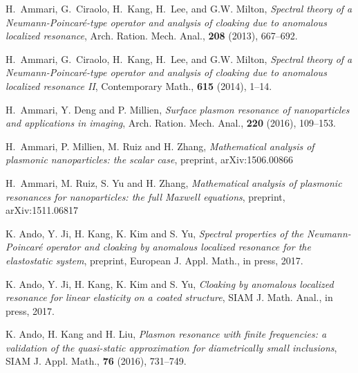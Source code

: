\documentclass[11pt,reqno,twoside]{amsart}
\theoremstyle{definition}
\theoremstyle{remark}
\numberwithin{equation}{section}
\begin{document}
\begin{thebibliography}{99}



H.~Ammari, G.~Ciraolo, H.~Kang, H.~Lee, and G.W. Milton, \emph{Spectral theory of a Neumann-Poincar\'{e}-type operator and
  analysis of cloaking due to anomalous localized resonance}, Arch. Ration.
  Mech. Anal., \textbf{208} (2013), 667--692.

H.~Ammari, G.~Ciraolo, H.~Kang, H.~Lee, and G.W. Milton, \emph{Spectral theory of a Neumann-Poincar\'{e}-type operator and analysis of cloaking due to anomalous localized resonance {I}{I}},
  Contemporary Math., \textbf{615} (2014), 1--14.

 {H.~Ammari, Y. Deng and P. Millien}, \emph{Surface plasmon resonance of nanoparticles and applications in imaging},
Arch. Ration. Mech. Anal., \textbf{220} (2016), 109--153.

 {H.~Ammari, P. Millien, M. Ruiz and H. Zhang}, \emph{Mathematical analysis of plasmonic nanoparticles: the scalar case}, preprint, arXiv:1506.00866

 {H.~Ammari, M. Ruiz, S. Yu and H. Zhang}, \emph{Mathematical analysis of plasmonic resonances for nanoparticles: the full Maxwell equations}, preprint, arXiv:1511.06817



 {K. Ando, Y. Ji, H. Kang, K. Kim and S. Yu}, \emph{Spectral properties of the Neumann-Poincar\'e operator and cloaking by anomalous localized resonance for the elastostatic system}, preprint, European J. Appl. Math., in press, 2017.

  {K. Ando, Y. Ji, H. Kang, K. Kim and S. Yu}, {\it Cloaking by anomalous localized resonance for linear elasticity on a coated structure}, SIAM J. Math. Anal., in press, 2017.


 {K. Ando, H. Kang and H. Liu}, \emph{Plasmon resonance with finite frequencies: a validation of the quasi-static approximation for diametrically small inclusions}, SIAM J. Appl. Math., \textbf{76} (2016), 731--749.


\end{thebibliography}
\end{document}
